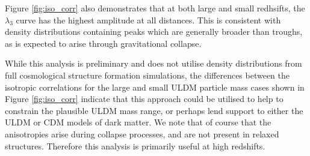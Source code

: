 \documentclass[a4paper,11pt]{article}
\begin{document}
Figure \ref{fig:iso_corr} also demonstrates that at both large and small redhsifts, the $\lambda_3$ curve has the highest amplitude at all distances. This is consistent with density distributions containing peaks which are generally broader than troughs, as is expected to arise through gravitational collapse. 

While this analysis is preliminary and does not utilise density distributions from full cosmological structure formation simulations, the differences between the isotropic correlations for the large and small ULDM particle mass cases shown in Figure \ref{fig:iso_corr} indicate that this approach could be utilised to help to constrain the plausible ULDM mass range, or perhaps lend support to either the ULDM or CDM models of dark matter. We note that of course that the anisotropies arise during collapse processes, and are not present in relaxed structures. Therefore this analysis is primarily useful at high redshifts.
 
\end{document}
